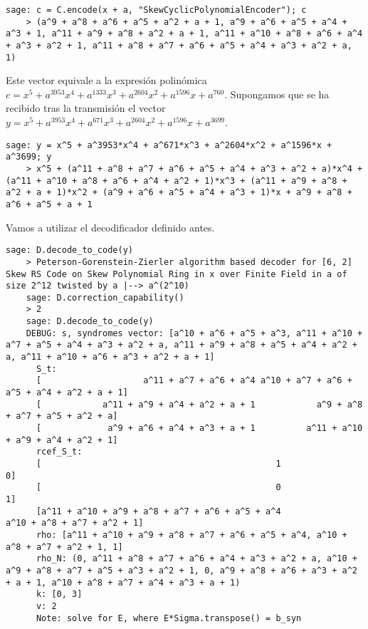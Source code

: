 \begin{example}
\begin{lstlisting}[gobble=4]
    sage: c = C.encode(x + a, "SkewCyclicPolynomialEncoder"); c
    > (a^9 + a^8 + a^6 + a^5 + a^2 + a + 1, a^9 + a^6 + a^5 + a^4 + a^3 + 1, a^11 + a^9 + a^8 + a^2 + a + 1, a^11 + a^10 + a^8 + a^6 + a^4 + a^3 + a^2 + 1, a^11 + a^8 + a^7 + a^6 + a^5 + a^4 + a^3 + a^2 + a, 1)
  \end{lstlisting}
  Este vector equivale a la expresión polinómica \(c = x^5 + a^{3953}x^4 + a^{1333}x^3 + a^{2604}x^2 + a^{1596}x + a^{760}\).
  Supongamos que se ha recibido tras la transmisión el vector \(y = x^5 + a^{3953}x^4 + a^{671}x^3 + a^{2604}x^2 + a^{1596}x + a^{3699}\).
  \begin{lstlisting}[gobble=4]
    sage: y = x^5 + a^3953*x^4 + a^671*x^3 + a^2604*x^2 + a^1596*x + a^3699; y
    > x^5 + (a^11 + a^8 + a^7 + a^6 + a^5 + a^4 + a^3 + a^2 + a)*x^4 + (a^11 + a^10 + a^8 + a^6 + a^4 + a^2 + 1)*x^3 + (a^11 + a^9 + a^8 + a^2 + a + 1)*x^2 + (a^9 + a^6 + a^5 + a^4 + a^3 + 1)*x + a^9 + a^8 + a^6 + a^5 + a + 1
  \end{lstlisting}
  Vamos a utilizar el decodificador definido antes.
  \begin{lstlisting}[gobble=4, basicstyle=\small\ttfamily]
    sage: D.decode_to_code(y)
    > Peterson-Gorenstein-Zierler algorithm based decoder for [6, 2] Skew RS Code on Skew Polynomial Ring in x over Finite Field in a of size 2^12 twisted by a |--> a^(2^10)
    sage: D.correction_capability()
    > 2
    sage: D.decode_to_code(y)
    DEBUG: s, syndromes vector: [a^10 + a^6 + a^5 + a^3, a^11 + a^10 + a^7 + a^5 + a^4 + a^3 + a^2 + a, a^11 + a^9 + a^8 + a^5 + a^4 + a^2 + a, a^11 + a^10 + a^6 + a^3 + a^2 + a + 1]
      S_t:
      [                    a^11 + a^7 + a^6 + a^4 a^10 + a^7 + a^6 + a^5 + a^4 + a^2 + a + 1]
      [            a^11 + a^9 + a^4 + a^2 + a + 1            a^9 + a^8 + a^7 + a^5 + a^2 + a]
      [             a^9 + a^6 + a^4 + a^3 + a + 1          a^11 + a^10 + a^9 + a^4 + a^2 + 1]
      rcef_S_t:
      [                                              1                                               0]
      [                                              0                                               1]
      [a^11 + a^10 + a^9 + a^8 + a^7 + a^6 + a^5 + a^4                      a^10 + a^8 + a^7 + a^2 + 1]
      rho: [a^11 + a^10 + a^9 + a^8 + a^7 + a^6 + a^5 + a^4, a^10 + a^8 + a^7 + a^2 + 1, 1]
      rho_N: (0, a^11 + a^8 + a^7 + a^6 + a^4 + a^3 + a^2 + a, a^10 + a^9 + a^8 + a^7 + a^5 + a^3 + a^2 + 1, 0, a^9 + a^8 + a^6 + a^3 + a^2 + a + 1, a^10 + a^8 + a^7 + a^4 + a^3 + a + 1)
      k: [0, 3]
      v: 2
      Note: solve for E, where E*Sigma.transpose() = b_syn

\end{lstlisting}
\end{example}
